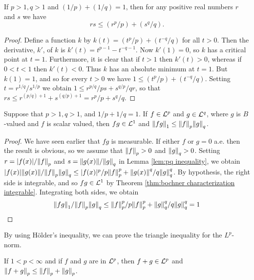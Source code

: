 \begin{lemma}
\label{lem:pq inequality}
If $p>1,q>1$ and $(1/p)+(1/q)=1$, then for any positive real numbers $r$ and $s$ we have $$rs\leq(r^p/p)+(s^q/q).$$
\end{lemma}

\begin{proof}
Define a function $k$ by $k(t)=(t^p/p)+(t^{-q}/q)$ for all $t>0$. Then the derivative, $k'$, of $k$ is $k'(t)=t^{p-1}-t^{-q-1}$. Now $k'(1)=0$, so $k$ has a critical point at $t=1$. Furthermore, it is clear that if $t>1$ then $k'(t)>0$, whereas if $0<t<1$ then $k'(t)<0$. Thus $k$ has an absolute minimum at $t=1$. But $k(1)=1$, and so for every $t>0$ we have $1\leq(t^p/p)+(t^{-q}/q)$. Setting $t=r^{1/q}/s^{1/p}$ we obtain $1\leq r^{p/q}/ps+s^{q/p}/qr$, so that $rs\leq r^{(p/q)+1}+s^{(q/p)+1}=r^p/p+s^q/q$.
\end{proof}

\begin{theorem}
\label{thm:holders}
Suppose that $p>1, q>1$, and $1/p+1/q=1$. If $f\in{\cal L}^p$ and $g\in{\cal L}^q$, where $g$ is $B$-valued and $f$ is scalar valued, then $fg\in{\cal L}^1$ and $\norm{fg}_1\leq\norm{f}_p\norm{g}_q$.
\end{theorem}

\begin{proof}
We have seen earlier that $fg$ is measurable. If either $f$ or $g=0$ a.e. then the result is obvious, so we assume that $\norm{f}_p>0$ and $\norm{g}_q>0$. Setting $r=|f(x)|/\norm{f}_p$ and $s=\norm{g(x)}/\norm{g}_q$ in Lemma \ref{lem:pq inequality}, we obtain $|f(x)|\norm{g(x)}/\norm{f}_p\norm{g}_q\leq|f(x)|^p/p\norm{f}_p^p+\norm{g(x)}^q/q\norm{g}_q^q$. By hypothesis, the right side is integrable, and so $f g\in {\cal L}^1$ by Theorem \ref{thm:bochner characterization integrable}. Integrating both sides, we obtain $$\norm{fg}_1/\norm{f}_p\norm{g}_q\leq\norm{f}_p^p/p\norm{f}_p^p+\norm{g}_q^q/q\norm{g}_q^q=1$$
\end{proof}

By using H\"older's inequality, we can prove the triangle inequality for the $L^p$-norm.

\begin{theorem}
\label{thm:minkowski inequality}
If $1<p<\infty$ and if $f$ and $g$ are in ${\cal L}^p$, then $f+g\in{\cal L}^p$ and $\norm{f+g}_p\leq\norm{f}_p+\norm{g}_p$.
\end{theorem}

